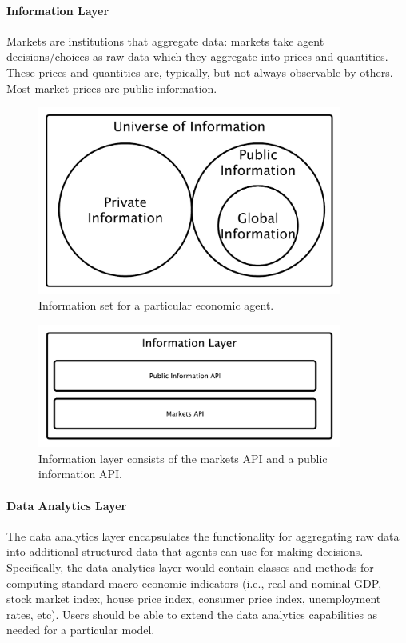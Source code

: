 \documentclass[11pt]{amsart}
\begin{document}
\paragraph{Information Layer}
Markets are institutions that aggregate data: markets take agent decisions/choices as raw data which they aggregate into prices and quantities. These prices and quantities are, typically, but not always observable by others.  Most market prices are public information.
\begin{figure}[H]
\centering
\includegraphics[width=10cm]{img/information-sets.pdf}
\caption{Information set for a particular economic agent.}
\end{figure}

\begin{figure}[H]
\centering
\includegraphics[width=10cm]{img/information-layer.pdf}
\caption{Information layer consists of the markets API and a public information API.}
\end{figure}

\paragraph{Data Analytics Layer}
The data analytics layer encapsulates the functionality for aggregating raw data into additional structured data that agents can use for making decisions.  Specifically, the data analytics layer would contain classes and methods for computing standard macro economic indicators (i.e., real and nominal GDP, stock market index, house price index, consumer price index, unemployment rates, etc). Users should be able to extend the data analytics capabilities as needed for a particular model.
\end{document}
